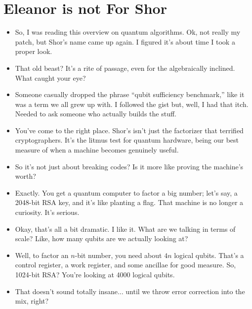 \newpage

\section*{Eleanor is not For Shor}

\begin{itemize}[leftmargin=1.5cm]

 \item[Eleanor:] So, I was reading this overview on quantum algorithms. Ok, not really my patch, but Shor’s name came up again. I figured it’s about time I took a proper look.

  \item[Nina:] That old beast? It’s a rite of passage, even for the algebraically inclined. What caught your eye?

  \item[Eleanor:] Someone casually dropped the phrase “qubit sufficiency benchmark,” like it was a term we all grew up with. I followed the gist but, well, I had that itch. Needed to ask someone who actually builds the stuff.

  \item[Nina:] You’ve come to the right place. Shor’s isn’t just the factorizer that terrified cryptographers. It’s the litmus test for quantum hardware, being our best measure of when a machine becomes genuinely useful.

  \item[Eleanor:] So it’s not just about breaking codes? Is it more like proving the machine’s worth?

  \item[Nina:] Exactly. You get a quantum computer to factor a big number; let's say, a 2048-bit RSA key, and it’s like planting a flag. That machine is no longer a curiosity. It’s serious.
  
  \item[Eleanor:] Okay, that’s all a bit dramatic. I like it. What are we talking in terms of scale? Like, how many qubits are we actually looking at?

  \item[Nina:] Well, to factor an \( n \)-bit number, you need about \( 4n \) logical qubits. That’s a control register, a work register, and some ancillae for good measure. So, 1024-bit RSA? You’re looking at 4000 logical qubits.

  \item[Eleanor:] That doesn’t sound totally insane... until we throw error correction into the mix, right?


\end{itemize}
